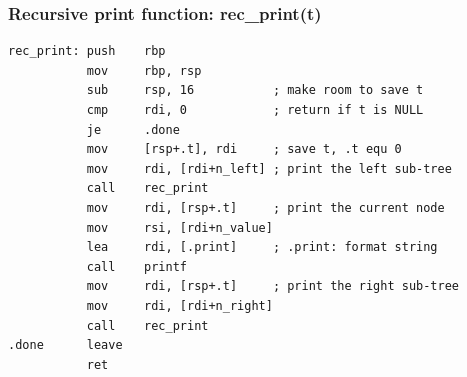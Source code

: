 \documentclass{beamer}
\begin{document}
\begin{frame}[fragile]
    \frametitle{Recursive print function: rec\_print(t)}
\small
\begin{verbatim}
rec_print: push    rbp
           mov     rbp, rsp
           sub     rsp, 16           ; make room to save t
           cmp     rdi, 0            ; return if t is NULL
           je      .done
           mov     [rsp+.t], rdi     ; save t, .t equ 0
           mov     rdi, [rdi+n_left] ; print the left sub-tree
           call    rec_print
           mov     rdi, [rsp+.t]     ; print the current node
           mov     rsi, [rdi+n_value]
           lea     rdi, [.print]     ; .print: format string
           call    printf
           mov     rdi, [rsp+.t]     ; print the right sub-tree
           mov     rdi, [rdi+n_right]
           call    rec_print
.done      leave
           ret
\end{verbatim}
\end{frame}
\end{document}
